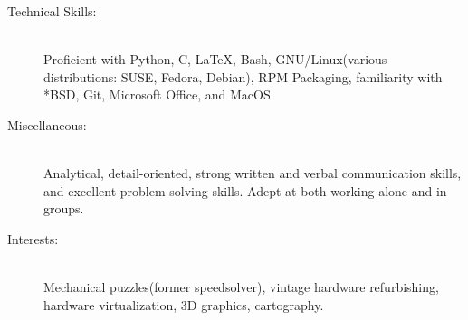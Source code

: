 \documentclass[letterpaper, 10pt]{article}
\begin{document}
\begin{description}
    \item[Technical Skills:] 
        \ \\Proficient with Python, C, \LaTeX, Bash, GNU/Linux(various distributions: SUSE, Fedora, Debian), RPM Packaging, familiarity with *BSD, Git, Microsoft Office, and MacOS
    \item[Miscellaneous:]
        \ \\ Analytical, detail-oriented, strong written and verbal communication skills, and excellent problem solving skills. Adept at both working alone and in groups. 
    \item[Interests:]
        \ \\Mechanical puzzles(former speedsolver), vintage hardware refurbishing, hardware virtualization, 3D graphics, cartography.
\end{description}
\end{document}
